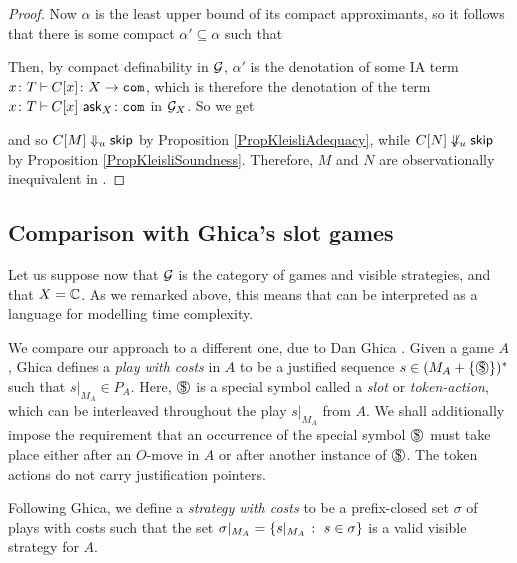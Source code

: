 \documentclass{article}
\begin{document}
\begin{proof}
  Now $\alpha$ is the least upper bound of its compact approximants, so it follows that there is some compact $\alpha'\subseteq \alpha$ such that
  Then, by compact definability in $\mathcal G$, $\alpha'$ is the denotation of some IA term $x\colon T \mathbin{\vdash} C[x]\colon X \to {\mathtt{com}}$, which is therefore the denotation of the term $x\colon T \mathbin{\vdash} C[x]\,\operatorname{{\mathsf{ask}}}_X \colon {\mathtt{com}}$ in $\mathcal G_X$.
  So we get
  and so $C[M]\Downarrow_u{\mathsf{skip}}$ by Proposition \ref{PropKleisliAdequacy}, while $C[N] \not\Downarrow_u {\mathsf{skip}}$ by Proposition \ref{PropKleisliSoundness}.
  Therefore, $M$ and $N$ are observationally inequivalent in \IAX.
\end{proof}

\subsection{Comparison with Ghica's slot games}

Let us suppose now that $\mathcal G$ is the category of games and visible strategies, and that $X=\mathbb{C}$.  
As we remarked above, this means that \IAX can be interpreted as a language for modelling time complexity.

We compare our approach to a different one, due to Dan Ghica \cite{SlotGames}.  
Given a game $A$, Ghica defines a \emph{play with costs} in $A$ to be a justified sequence $s\in (M_A + \{\slot\})^*$ such that $s\vert_{M_A}\in P_A$.
Here, $\slot$ is a special symbol called a \emph{slot} or \emph{token-action}, which can be interleaved throughout the play $s\vert_{M_A}$ from $A$.  
We shall additionally impose the requirement that an occurrence of the special symbol $\slot$ must take place either after an $O$-move in $A$ or after another instance of $\slot$.
The token actions do not carry justification pointers.

Following Ghica, we define a \emph{strategy with costs} to be a prefix-closed set $\sigma$ of plays with costs such that the set $\sigma\vert_{M_A} = \{s\vert_{M_A}\;\colon\; s\in \sigma\}$ is a valid visible strategy for $A$.
\end{document}
